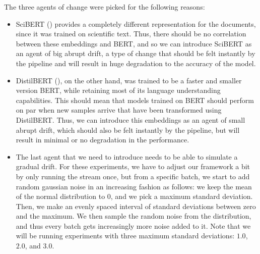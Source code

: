 \documentclass[12pt]{extreport}
\begin{document}
The three agents of change were picked for the following reasons:
\begin{itemize}
    \item SciBERT (\cite{scibert}) provides a completely different representation for the documents, since it was trained on scientific text. Thus, there should be no correlation between these embeddings and BERT, and so we can introduce SciBERT as an agent of big abrupt drift, a type of change that should be felt instantly by the pipeline and will result in huge degradation to the accuracy of the model.
    \item DistilBERT (\cite{distilbert}), on the other hand, was trained to be a faster and smaller version BERT, while retaining most of its language understanding capabilities. This should mean that models trained on BERT should perform on par when new samples arrive that have been transformed using DistilBERT. Thus, we can introduce this embeddings as an agent of small abrupt drift, which should also be felt instantly by the pipeline, but will result in minimal or no degradation in the performance.
    \item The last agent that we need to introduce needs to be able to simulate a gradual drift. For these experiments, we have to adjust our framework a bit by only running the stream once, but from a specific batch, we start to add random gaussian noise in an increasing fashion as follows: we keep the mean of the normal distribution to 0, and we pick a maximum standard deviation. Then, we make an evenly spaced interval of standard deviations between zero and the maximum. We then sample the random noise from the distribution, and thus every batch gets increasingly more noise added to it. Note that we will be running experiments with three maximum standard deviations: $1.0$, $2.0$, and $3.0$.
\end{itemize}
\end{document}
